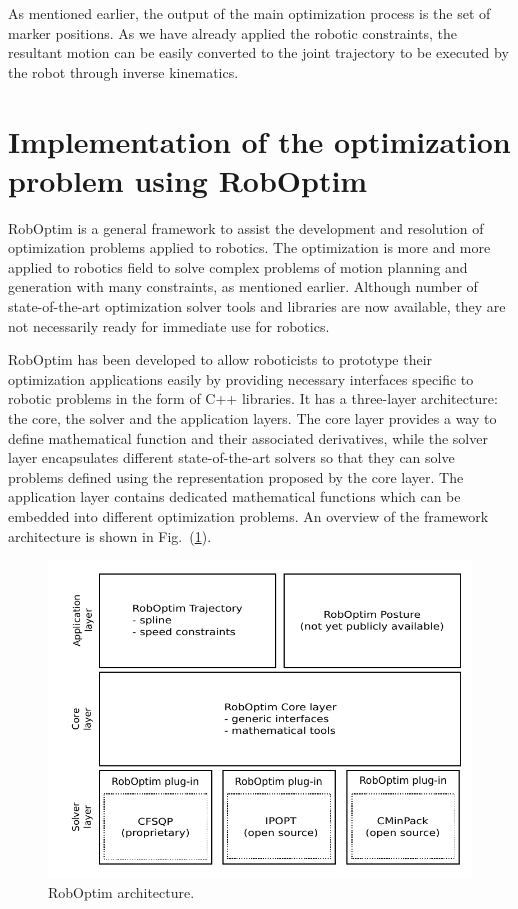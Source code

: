 \documentclass[letterpaper, 10 pt, conference]{ieeeconf}  %
\begin{document}
As mentioned earlier, the output of the main optimization process is
the set of marker positions. As we have already applied the robotic
constraints, the resultant motion can be easily converted to the 
joint trajectory to be executed by the robot through inverse
kinematics.

\section{Implementation of the optimization problem using RobOptim}
\label{sec:implementation}

RobOptim is a general framework to assist the development and resolution of
optimization problems applied to robotics. 
The optimization is more and more applied to robotics field to solve
complex problems of motion planning and generation with many
constraints, as mentioned earlier.
Although number of state-of-the-art optimization solver tools and
libraries are now available, they are not necessarily ready for
immediate use for robotics.

RobOptim has been developed to allow roboticists to prototype their
optimization applications easily by providing necessary interfaces
specific to robotic problems in the form of C++ libraries.
It has a three-layer
architecture: the core, the solver and the application layers.
The core layer provides a way to define mathematical
function and their associated derivatives, while the solver layer encapsulates
different state-of-the-art solvers so that they can solve problems
defined using the representation proposed by the core layer. 
The application layer contains dedicated mathematical functions which
can be embedded into different optimization problems. An overview of
the framework architecture is shown in Fig.~(\ref{fig:roboptim}).

\begin{figure}[b]
  \includegraphics[width=\linewidth]{figure/roboptim-architecture.pdf}
  \caption{RobOptim  architecture.}
  \label{fig:roboptim}
\end{figure}
\end{document}

